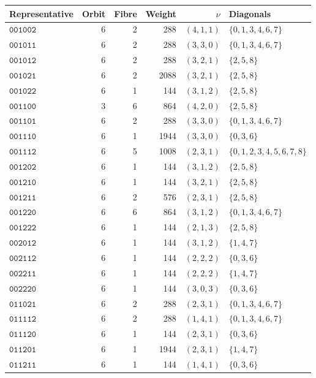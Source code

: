 \begin{table}[!htbp]
\centering\fontsize{8.8}{10.1}\selectfont
\setlength{\tabcolsep}{4pt}\renewcommand{\arraystretch}{1.04}
\begin{tabular}{@{}lrrrrl@{}}
\toprule Representative&Orbit&Fibre&Weight&\(\nu\)&Diagonals\\\midrule
\(\mathtt{001002}\)&6&2&288&\((4,1,1)\)&\(\{0,1,3,4,6,7\}\)\\
\(\mathtt{001011}\)&6&2&288&\((3,3,0)\)&\(\{0,1,3,4,6,7\}\)\\
\(\mathtt{001012}\)&6&2&288&\((3,2,1)\)&\(\{2,5,8\}\)\\
\(\mathtt{001021}\)&6&2&2088&\((3,2,1)\)&\(\{2,5,8\}\)\\
\(\mathtt{001022}\)&6&1&144&\((3,1,2)\)&\(\{2,5,8\}\)\\
\(\mathtt{001100}\)&3&6&864&\((4,2,0)\)&\(\{2,5,8\}\)\\
\(\mathtt{001101}\)&6&2&288&\((3,3,0)\)&\(\{0,1,3,4,6,7\}\)\\
\(\mathtt{001110}\)&6&1&1944&\((3,3,0)\)&\(\{0,3,6\}\)\\
\(\mathtt{001112}\)&6&5&1008&\((2,3,1)\)&\(\{0,1,2,3,4,5,6,7,8\}\)\\
\(\mathtt{001202}\)&6&1&144&\((3,1,2)\)&\(\{2,5,8\}\)\\
\(\mathtt{001210}\)&6&1&144&\((3,2,1)\)&\(\{2,5,8\}\)\\
\(\mathtt{001211}\)&6&2&576&\((2,3,1)\)&\(\{2,5,8\}\)\\
\(\mathtt{001220}\)&6&6&864&\((3,1,2)\)&\(\{0,1,3,4,6,7\}\)\\
\(\mathtt{001222}\)&6&1&144&\((2,1,3)\)&\(\{2,5,8\}\)\\
\(\mathtt{002012}\)&6&1&144&\((3,1,2)\)&\(\{1,4,7\}\)\\
\(\mathtt{002112}\)&6&1&144&\((2,2,2)\)&\(\{0,3,6\}\)\\
\(\mathtt{002211}\)&6&1&144&\((2,2,2)\)&\(\{1,4,7\}\)\\
\(\mathtt{002220}\)&6&1&144&\((3,0,3)\)&\(\{0,3,6\}\)\\
\(\mathtt{011021}\)&6&2&288&\((2,3,1)\)&\(\{0,1,3,4,6,7\}\)\\
\(\mathtt{011112}\)&6&2&288&\((1,4,1)\)&\(\{0,1,3,4,6,7\}\)\\
\(\mathtt{011120}\)&6&1&144&\((2,3,1)\)&\(\{0,3,6\}\)\\
\(\mathtt{011201}\)&6&1&1944&\((2,3,1)\)&\(\{1,4,7\}\)\\
\(\mathtt{011211}\)&6&1&144&\((1,4,1)\)&\(\{0,3,6\}\)\\

\end{tabular}
\end{table}
